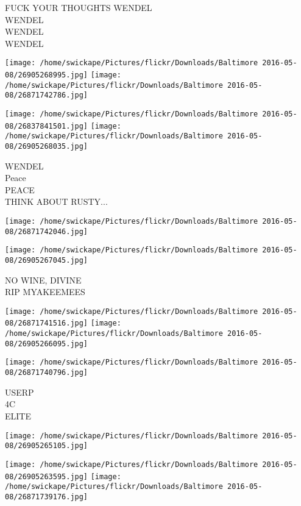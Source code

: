\documentclass[10pt,letterpaper]{article}
\begin{document}
FUCK YOUR THOUGHTS WENDEL\\
WENDEL\\
WENDEL\\
WENDEL\\
\pagebreak

\texttt{[image: /home/swickape/Pictures/flickr/Downloads/Baltimore 2016-05-08/26905268995.jpg]}
\texttt{[image: /home/swickape/Pictures/flickr/Downloads/Baltimore 2016-05-08/26871742786.jpg]}

\texttt{[image: /home/swickape/Pictures/flickr/Downloads/Baltimore 2016-05-08/26837841501.jpg]}
\texttt{[image: /home/swickape/Pictures/flickr/Downloads/Baltimore 2016-05-08/26905268035.jpg]}

WENDEL\\
Peace\\
PEACE\\
THINK ABOUT RUSTY...\\
\pagebreak

\texttt{[image: /home/swickape/Pictures/flickr/Downloads/Baltimore 2016-05-08/26871742046.jpg]}

\vspace{0.25in}
\texttt{[image: /home/swickape/Pictures/flickr/Downloads/Baltimore 2016-05-08/26905267045.jpg]}

NO WINE, DIVINE\\
RIP MYAKEEMEES\\
\pagebreak

\texttt{[image: /home/swickape/Pictures/flickr/Downloads/Baltimore 2016-05-08/26871741516.jpg]}
\texttt{[image: /home/swickape/Pictures/flickr/Downloads/Baltimore 2016-05-08/26905266095.jpg]}

\texttt{[image: /home/swickape/Pictures/flickr/Downloads/Baltimore 2016-05-08/26871740796.jpg]}

USERP\\
4C\\
ELITE\\
\pagebreak

\texttt{[image: /home/swickape/Pictures/flickr/Downloads/Baltimore 2016-05-08/26905265105.jpg]}

\vspace{0.25in}
\texttt{[image: /home/swickape/Pictures/flickr/Downloads/Baltimore 2016-05-08/26905263595.jpg]}
\texttt{[image: /home/swickape/Pictures/flickr/Downloads/Baltimore 2016-05-08/26871739176.jpg]}
\end{document}

